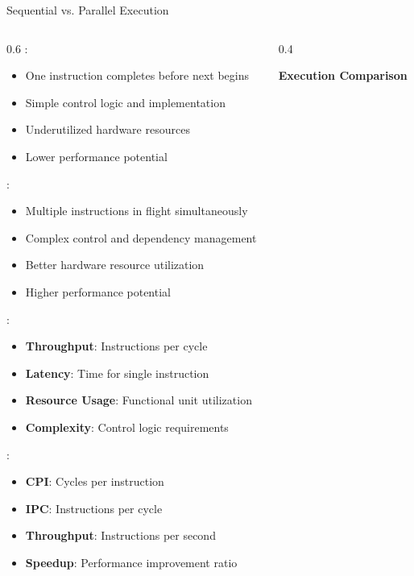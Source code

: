 \begin{frame}{Sequential vs. Parallel Execution}
\begin{columns}
\begin{column}{0.6\textwidth}
:
\begin{itemize}
\item One instruction completes before next begins
\item Simple control logic and implementation
\item Underutilized hardware resources
\item Lower performance potential
\end{itemize}

\vspace{0.3cm}
:
\begin{itemize}
\item Multiple instructions in flight simultaneously
\item Complex control and dependency management
\item Better hardware resource utilization
\item Higher performance potential
\end{itemize}

\vspace{0.3cm}
:
\begin{itemize}
\item \textbf{Throughput}: Instructions per cycle
\item \textbf{Latency}: Time for single instruction
\item \textbf{Resource Usage}: Functional unit utilization
\item \textbf{Complexity}: Control logic requirements
\end{itemize}

\vspace{0.3cm}
:
\begin{itemize}
\item \textbf{CPI}: Cycles per instruction
\item \textbf{IPC}: Instructions per cycle
\item \textbf{Throughput}: Instructions per second
\item \textbf{Speedup}: Performance improvement ratio
\end{itemize}
\end{column}
\begin{column}{0.4\textwidth}
\begin{center}
\textbf{Execution Comparison}
\vspace{0.3cm}


\end{center}
\end{column}
\end{columns}
\end{frame}
